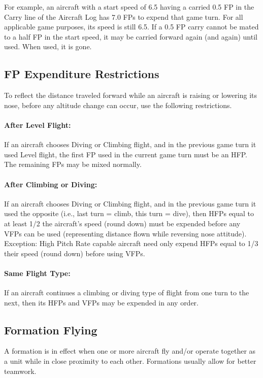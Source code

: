 For example, an aircraft with a start speed of 6.5 having a carried 0.5 FP in the Carry line of the Aircraft Log has 7.0 FPs to expend that game turn. For all applicable game purposes, its speed is still 6.5. If a 0.5 FP carry cannot be mated to a half FP in the start speed, it may be carried forward again (and again) until used. When used, it is gone.

\subsection{FP Expenditure Restrictions}

To reflect the distance traveled forward while an aircraft is raising or lowering its nose, before any altitude change can occur, use the following restrictions.

\paragraph{After Level Flight:} If an aircraft chooses Diving or Climbing flight, and in the previous game turn it used Level flight, the first FP used in the current game turn must be an HFP. The remaining FPs may be mixed normally.

\paragraph{After Climbing or Diving:} If an aircraft chooses Diving or Climbing flight, and in the previous game turn it used the opposite (i.e., last turn = climb, this turn = dive), then HFPs equal to at least 1/2 the aircraft's speed (round down) must be expended before any VFPs can be used (representing distance flown while reversing nose attitude). Exception: High Pitch Rate capable aircraft need only expend HFPs equal to 1/3 their speed (round down) before using VFPs.

\paragraph{Same Flight Type:} If an aircraft continues a climbing or diving type of flight from one turn to the next, then its HFPs and VFPs may be expended in any order.

\subsection{Formation Flying}

A formation is in effect when one or more aircraft fly and/or operate together as a unit while in close proximity to each other. Formations usually allow for better teamwork.

